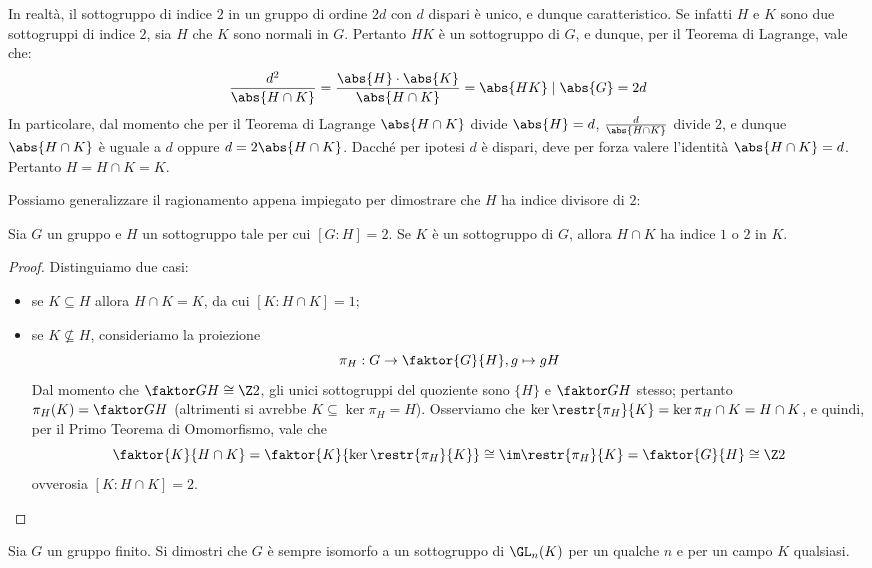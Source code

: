 \documentclass[11pt]{scrartcl}
\begin{document}
	\begin{remark}
		In realtà, il sottogruppo di indice $2$ in un gruppo di ordine $2d$ con
		$d$ dispari è
		unico, e dunque caratteristico. Se infatti $H$ e $K$ sono due sottogruppi
		di indice $2$, sia $H$ che $K$ sono normali in $G$. Pertanto
		$HK$ è un sottogruppo di $G$, e dunque, per il Teorema di Lagrange,
		vale che:
		\[ \frac{d^2}{\abs{H \cap K}} = \frac{\abs{H} \cdot \abs{K}}{\abs{H \cap K}} = \abs{HK} \mid \abs{G} = 2d \]
		In particolare, dal momento che per il Teorema di Lagrange $\abs{H \cap K}$ divide
		$\abs{H} = d$, $\frac{d}{\abs{H \cap K}}$ divide $2$, e dunque
		$\abs{H \cap K}$ è uguale a $d$ oppure $d = 2 \abs{H \cap K}$. 
		Dacché per ipotesi $d$ è dispari, deve per forza valere l'identità
		$\abs{H \cap K} = d$. Pertanto $H = H \cap K = K$.
	\end{remark}
	
	Possiamo generalizzare il ragionamento appena impiegato per dimostrare
	che $H$ ha indice divisore di $2$:
	
	\begin{proposition}
		\label{prop1.49}
		Sia $G$ un gruppo e $H$ un sottogruppo tale per cui $[G:H] = 2$. Se
		$K$ è un sottogruppo di $G$, allora $H\cap K$ ha indice $1$ o $2$ in $K$.
	\end{proposition}
	
	\begin{proof}
		Distinguiamo due casi:
		\begin{itemize}
			\item se $K \subseteq H$ allora $H \cap K = K$, da cui $[K:H\cap K] = 1$;
			\item se $K \nsubseteq H$, consideriamo la proiezione 
			\[
			\pi_H: G \to \faktor{G}{H}, g \mapsto gH
			\]
			Dal momento che $\faktor G H \cong \Z2$, gli unici sottogruppi 
			del quoziente sono $\{H\}$ e $\faktor G H$ stesso; pertanto 
			$\pi_H(K) = \faktor G H$ (altrimenti si avrebbe $K \subseteq \ker \pi_H = H$). Osserviamo che $\ker \restr{\pi_{H}}{K}
			= \ker \pi_H \cap K = H \cap K$, e quindi, per il Primo Teorema di Omomorfismo,
			vale che 
			\[ \faktor{K}{H\cap K} = \faktor{K}{\ker \restr{\pi_{H}}{K}} \cong \im \restr{\pi_{H}}{K} = \faktor{G}{H} \cong \Z2 \]
			ovverosia $[K:H\cap K] = 2$.
		\end{itemize}
	\end{proof}
	
	\begin{exercise}[$\star$]
		Sia $G$ un gruppo finito. Si dimostri che $G$ è sempre isomorfo a
		un sottogruppo di $\GL_n(K)$ per un qualche $n$ e per un campo
		$K$ qualsiasi.
	\end{exercise}
	
\end{document}
